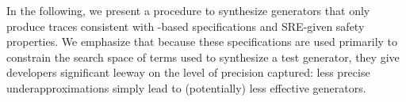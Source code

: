 
  In the following, we present a procedure to synthesize generators that only
  produce traces consistent with \tyName{}-based specifications and
  SRE-given safety properties.  We emphasize that because these
  specifications are used primarily to constrain the search space of
  terms used to synthesize a test generator, they give developers
  significant leeway on the level of precision captured: less precise
  underapproximations simply lead to (potentially) less effective
  generators.
